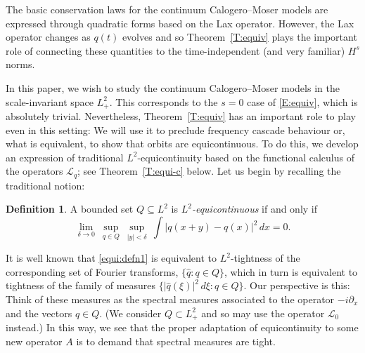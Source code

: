 \documentclass{amsart}
\numberwithin{equation}{section}
\theoremstyle{definition}
\newtheorem{definition}[theorem]{Definition}
\newcommand{\Lc}{\mathcal{L}}
\begin{document}
The basic conservation laws for the continuum Calogero--Moser models are expressed through quadratic forms based on the Lax operator.  However, the Lax operator changes as $q(t)$ evolves and so Theorem~\ref{T:equiv} plays the important role of connecting these quantities to the time-independent (and very familiar) $H^s$ norms.

In this paper, we wish to study the continuum Calogero--Moser models in the scale-invariant space $L^2_+$.  This corresponds to the $s=0$ case of \eqref{E:equiv}, which is absolutely trivial.  Nevertheless, Theorem~\ref{T:equiv} has an important role to play even in this setting:  We will use it to preclude frequency cascade behaviour or, what is equivalent, to show that orbits are equicontinuous.  To do this, we develop an expression of traditional $L^2$-equicontinuity based on the functional calculus of the operators $\Lc_q$; see Theorem~\ref{T:equi-c} below.  Let us begin by recalling the traditional notion:

\begin{definition}\label{D:equi}
A bounded set $Q\subseteq L^2$ is \emph{$L^2$-equicontinuous} if and only if
\begin{equation}\label{equi:defn1}
\lim_{\delta\to 0}\ \sup_{q\in Q}\ \sup_{|y|<\delta} \ \int \bigl| q(x+y) -q(x)\bigr|^2 \,dx = 0.
\end{equation}
\end{definition}

It is well known that \eqref{equi:defn1} is equivalent to $L^2$-tightness of the corresponding set of Fourier transforms, $\{\widehat q: q \in Q\}$, which in turn is equivalent to tightness of the family of measures $\{ |\widehat q(\xi)|^2\,d\xi : q\in Q\}$.  Our perspective is this: Think of these measures as the spectral measures associated to the operator $-i\partial_x$ and the vectors $q\in Q$.  (We consider $Q\subset L^2_+$ and so may use the operator $\Lc_0$ instead.)  In this way, we see that the proper adaptation of equicontinuity to some new operator $A$ is to demand that spectral measures are tight.
\end{document}
